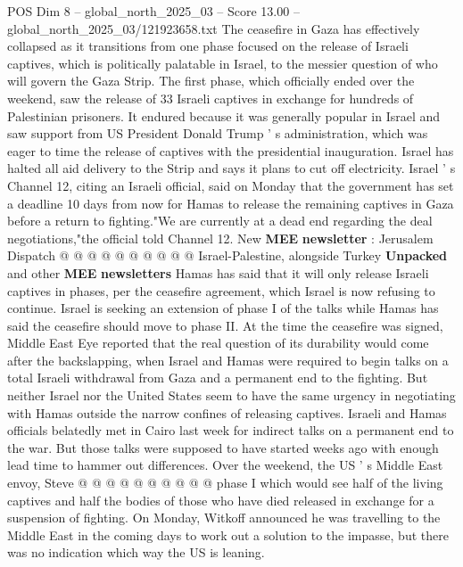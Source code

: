 \begin{textsample}{POS Dim 8 – global\_north\_2025\_03 – Score 13.00 – global\_north\_2025\_03/121923658.txt}  \label{ex:f8_pos_087}
The ceasefire in Gaza has effectively collapsed as it transitions from one phase focused on the release of Israeli captives, which is politically palatable in Israel, to the messier question of who will govern the Gaza Strip.
The first phase, which officially ended over the weekend, saw the release of 33 Israeli captives in exchange for hundreds of Palestinian prisoners.
It endured because it was generally popular in Israel and saw support from US President Donald Trump ' s administration, which was eager to time the release of captives with the presidential inauguration.
Israel has halted all aid delivery to the Strip and says it plans to cut off electricity.
Israel ' s Channel 12, citing an Israeli official, said on Monday that the government has set a deadline 10 days from now for Hamas to release the remaining captives in Gaza before a return to fighting."We are currently at a dead end regarding the deal negotiations,"the official told Channel 12.
New \textbf{MEE} \textbf{newsletter} : Jerusalem Dispatch @ @ @ @ @ @ @ @ @ @ Israel-Palestine, alongside Turkey \textbf{Unpacked} and other \textbf{MEE} \textbf{newsletters} Hamas has said that it will only release Israeli captives in phases, per the ceasefire agreement, which Israel is now refusing to continue.
Israel is seeking an extension of phase I of the talks while Hamas has said the ceasefire should move to phase II.
At the time the ceasefire was signed, Middle East Eye reported that the real question of its durability would come after the backslapping, when Israel and Hamas were required to begin talks on a total Israeli withdrawal from Gaza and a permanent end to the fighting.
But neither Israel nor the United States seem to have the same urgency in negotiating with Hamas outside the narrow confines of releasing captives.
Israeli and Hamas officials belatedly met in Cairo last week for indirect talks on a permanent end to the war.
But those talks were supposed to have started weeks ago with enough lead time to hammer out differences.
Over the weekend, the US ' s Middle East envoy, Steve @ @ @ @ @ @ @ @ @ @ phase I which would see half of the living captives and half the bodies of those who have died released in exchange for a suspension of fighting.
On Monday, Witkoff announced he was travelling to the Middle East in the coming days to work out a solution to the impasse, but there was no indication which way the US is leaning.

\end{textsample}
